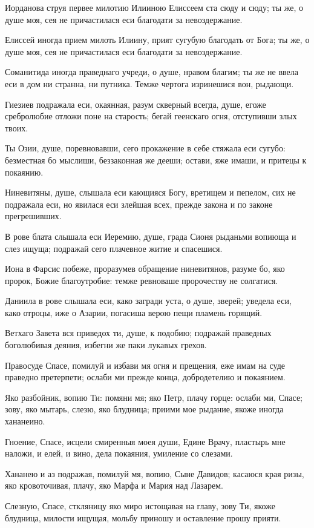 Иорданова струя первее милотию Илииною Елиссеем ста сюду и сюду; ты же, о душе моя, сея не причастилася еси благодати за невоздержание.

Елиссей иногда прием милоть Илиину, прият сугубую благодать от Бога; ты же, о душе моя, сея не причастилася еси благодати за невоздержание.

Соманитида иногда праведнаго учреди, о душе, нравом благим; ты же не ввела еси в дом ни странна, ни путника. Темже чертога изринешися вон, рыдающи.

Гиезиев подражала еси, окаянная, разум скверный всегда, душе, егоже сребролюбие отложи поне на старость; бегай геенскаго огня, отступивши злых твоих.

Ты Озии, душе, поревновавши, сего прокажение в себе стяжала еси сугубо: безместная бо мыслиши, беззаконная же дееши; остави, яже имаши, и притецы к покаянию.

Ниневитяны, душе, слышала еси кающияся Богу, вретищем и пепелом, сих не подражала еси, но явилася еси злейшая всех, прежде закона и по законе прегрешивших.

В рове блата слышала еси Иеремию, душе, града Сионя рыданьми вопиюща и слез ищуща; подражай сего плачевное житие и спасешися.

Иона в Фарсис побеже, проразумев обращение ниневитянов, разуме бо, яко пророк, Божие благоутробие: темже ревноваше пророчеству не солгатися.

Даниила в рове слышала еси, како загради уста, о душе, зверей; уведела еси, како отроцы, иже о Азарии, погасиша верою пещи пламень горящий.

Ветхаго Завета вся приведох ти, душе, к подобию; подражай праведных боголюбивая деяния, избегни же паки лукавых грехов.

Правосуде Спасе, помилуй и избави мя огня и прещения, еже имам на суде праведно претерпети; ослаби ми прежде конца, добродетелию и покаянием.

Яко разбойник, вопию Ти: помяни мя; яко Петр, плачу горце: ослаби ми, Спасе; зову, яко мытарь, слезю, яко блудница; приими мое рыдание, якоже иногда хананеино.

Гноение, Спасе, исцели смиренныя моея души, Едине Врачу, пластырь мне наложи, и елей, и вино, дела покаяния, умиление со слезами.

Хананею и аз подражая, помилуй мя, вопию, Сыне Давидов; касаюся края ризы, яко кровоточивая, плачу, яко Марфа и Мария над Лазарем.

Слезную, Спасе, сткляницу яко миро истощавая на главу, зову Ти, якоже блудница, милости ищущая, мольбу приношу и оставление прошу прияти.

